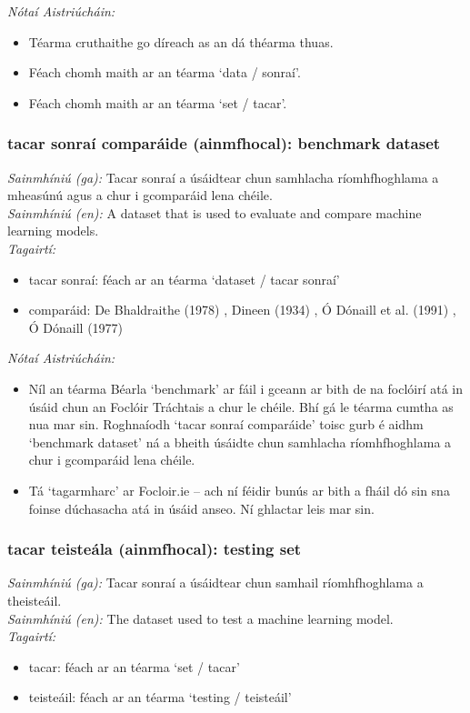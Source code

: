  \noindent \textit{Nótaí Aistriúcháin:}
\begin{itemize}
	\item Téarma cruthaithe go díreach as an dá théarma thuas.
	\item Féach chomh maith ar an téarma `data / sonraí'.
	\item Féach chomh maith ar an téarma `set / tacar'.
\end{itemize}


\subsubsection*{tacar sonraí comparáide (ainmfhocal): benchmark dataset}
 \noindent \textit{Sainmhíniú (ga):} Tacar sonraí a úsáidtear chun samhlacha ríomhfhoghlama a mheasúnú agus a chur i gcomparáid lena chéile.
\\
 \noindent \textit{Sainmhíniú (en):} A dataset that is used to evaluate and compare machine learning models.
\\
 \noindent \textit{Tagairtí:}
\begin{itemize}
	\item tacar sonraí: féach ar an téarma `dataset / tacar sonraí'
	\item comparáid: De Bhaldraithe (1978) \cite{de-bhaldraithe}, Dineen (1934) \cite{dineen}, Ó Dónaill et al. (1991) \cite{focloir-beag}, Ó Dónaill (1977) \cite{odonaill}
\end{itemize}

 \noindent \textit{Nótaí Aistriúcháin:}
\begin{itemize}
	\item Níl an téarma Béarla `benchmark' ar fáil i gceann ar bith de na foclóirí atá in úsáid chun an Foclóir Tráchtais a chur le chéile. Bhí gá le téarma cumtha as nua mar sin. Roghnaíodh `tacar sonraí comparáide' toisc gurb é aidhm `benchmark dataset' ná a bheith úsáidte chun samhlacha ríomhfhoghlama a chur i gcomparáid lena chéile.
	\item Tá `tagarmharc' ar Focloir.ie -- ach ní féidir bunús ar bith a fháil dó sin sna foinse dúchasacha atá in úsáid anseo. Ní ghlactar leis mar sin.
\end{itemize}


\subsubsection*{tacar teisteála (ainmfhocal): testing set}
 \noindent \textit{Sainmhíniú (ga):} Tacar sonraí a úsáidtear chun samhail ríomhfhoghlama a theisteáil.
\\
 \noindent \textit{Sainmhíniú (en):} The dataset used to test a machine learning model.
\\
 \noindent \textit{Tagairtí:}
\begin{itemize}
	\item tacar: féach ar an téarma `set / tacar'
	\item teisteáil: féach ar an téarma `testing / teisteáil'
\end{itemize}

